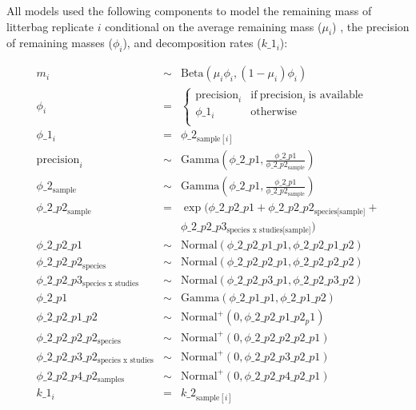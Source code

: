 \documentclass[
  12pt,
]{article}
\begin{document}
All models used the following components to model the remaining mass of litterbag replicate \(i\) conditional on the average remaining mass (\(\mu_i\)) , the precision of remaining masses (\(\phi_i\)), and decomposition rates (\(k\_1_i\)):

\begin{equation}
\begin{aligned}
m_i & \sim & \text{Beta}(\mu_i\phi_{i},(1 - \mu_i)\phi_{i})\\
\phi_{i} & = & \begin{cases}
\text{precision}_i & \text{if}~\text{precision}_i~\text{is available}\\
\phi\_1_{i} & \text{otherwise}\\
\end{cases}\\
\phi\_1_{i} & = & \phi\_2_{\text{sample}[i]}\\
\text{precision}_i & \sim & \text{Gamma}\left(\phi\_2\_p1, \frac{\phi\_2\_p1}{\phi\_2\_p2_{\text{sample}}}\right)\\
\phi\_2_{\text{sample}} & \sim & \text{Gamma}\left(\phi\_2\_p1, \frac{\phi\_2\_p1}{\phi\_2\_p2_{\text{sample}}}\right)\\
\phi\_2\_p2_{\text{sample}} & = & \exp(\phi\_2\_p2\_p1 + \phi\_2\_p2\_p2_{\text{species[sample]}} + \\
                                && \phi\_2\_p2\_p3_{\text{species x studies[sample]}})\\
\phi\_2\_p2\_p1 & \sim & \text{Normal}(\phi\_2\_p2\_p1\_p1, \phi\_2\_p2\_p1\_p2)\\
\phi\_2\_p2\_p2_{\text{species}} & \sim & \text{Normal}(\phi\_2\_p2\_p2\_p1, \phi\_2\_p2\_p2\_p2)\\
\phi\_2\_p2\_p3_{\text{species x studies}} & \sim & \text{Normal}(\phi\_2\_p2\_p3\_p1, \phi\_2\_p2\_p3\_p2)\\
\phi\_2\_p1 & \sim & \text{Gamma}(\phi\_2\_p1\_p1, \phi\_2\_p1\_p2)\\
\phi\_2\_p2\_p1\_p2 & \sim & \text{Normal}^+(0, \phi\_2\_p2\_p1\_p2_p1)\\
\phi\_2\_p2\_p2\_p2_{\text{species}} & \sim & \text{Normal}^+(0, \phi\_2\_p2\_p2\_p2\_p1)\\
\phi\_2\_p2\_p3\_p2_{\text{species x studies}} & \sim & \text{Normal}^+(0, \phi\_2\_p2\_p3\_p2\_p1)\\
\phi\_2\_p2\_p4\_p2_{\text{samples}} & \sim & \text{Normal}^+(0, \phi\_2\_p2\_p4\_p2\_p1)\\
k\_1_i & = & k\_2_{\text{sample}[i]}\\

\end{aligned}
\end{equation}
\end{document}
